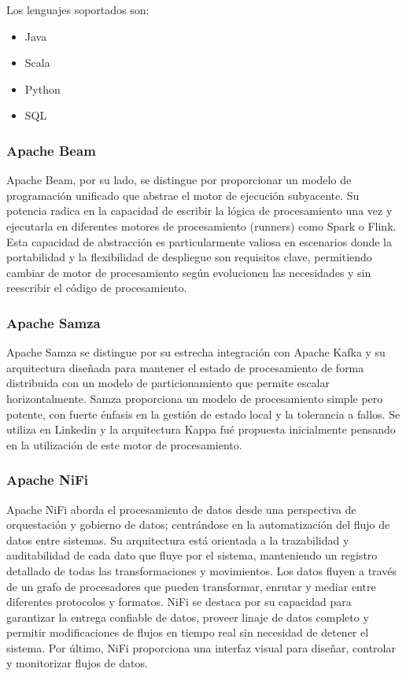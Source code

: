 Los lenguajes soportados son:

\begin{itemize}
    \item Java
    \item Scala
    \item Python
    \item SQL
\end{itemize}

\subsubsection{Apache Beam}

Apache Beam, por su lado, se distingue por proporcionar un modelo de programación unificado que abstrae el motor de ejecución subyacente.
Su potencia radica en la capacidad de escribir la lógica de procesamiento una vez y ejecutarla en 
diferentes motores de procesamiento (runners) como Spark o Flink.
Esta capacidad de abstracción es particularmente valiosa en escenarios donde la portabilidad y la flexibilidad de despliegue son requisitos clave, 
permitiendo cambiar de motor de procesamiento según evolucionen las necesidades y sin reescribir el código de procesamiento.

\subsubsection{Apache Samza}

Apache Samza se distingue por su estrecha integración con Apache Kafka y su arquitectura diseñada para mantener el estado 
de procesamiento de forma distribuida con un modelo de particionamiento que permite escalar horizontalmente.
Samza proporciona un modelo de procesamiento simple pero potente, con fuerte énfasis en la gestión de estado local y la tolerancia a fallos.
Se utiliza en Linkedin y la arquitectura Kappa fué propuesta inicialmente pensando en la utilización de este motor de procesamiento.

\subsubsection{Apache NiFi}

Apache NiFi aborda el procesamiento de datos desde una perspectiva de orquestación y gobierno de datos; 
centrándose en la automatización del flujo de datos entre sistemas.
Su arquitectura está orientada a la trazabilidad y auditabilidad de cada dato que fluye por el sistema, 
manteniendo un registro detallado de todas las transformaciones y movimientos. Los datos fluyen 
a través de un grafo de procesadores que pueden transformar, enrutar y mediar entre diferentes protocolos y formatos. 
NiFi se destaca por su capacidad para garantizar la entrega confiable de datos, proveer linaje de datos completo y 
permitir modificaciones de flujos en tiempo real sin necesidad de detener el sistema.
Por último, NiFi proporciona una interfaz visual para diseñar, controlar y 
monitorizar flujos de datos.

